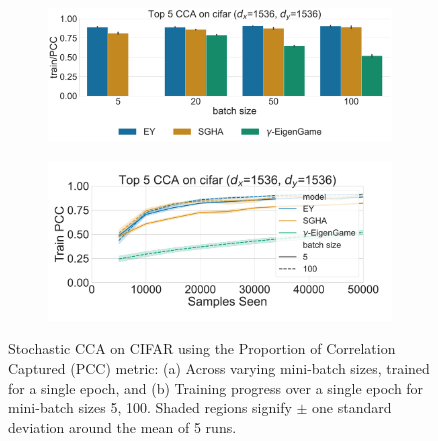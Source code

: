 \begin{figure}
    \centering
    \begin{subfigure}[b]{0.49\textwidth}
        \centering
        \includegraphics[width=\textwidth]{figures/CCA/cifar_models_different_batch_sizes}
        \caption{}
        \label{fig:corr_cifar}
    \end{subfigure}
    \hfill
    \begin{subfigure}[b]{0.49\textwidth}
        \centering
        \includegraphics[width=\textwidth]{figures/CCA/cifar_allbatchsizes_pcc}
        \caption{}
        \label{fig:lr_cifar}
    \end{subfigure}
    \caption{Stochastic CCA on CIFAR using the Proportion of Correlation Captured (PCC) metric: (a) Across varying mini-batch sizes, trained for a single epoch, and (b) Training progress over a single epoch for mini-batch sizes 5, 100.
    Shaded regions signify \(\pm\) one standard deviation around the mean of 5 runs.}\label{fig:scca_cifar}
\end{figure}

